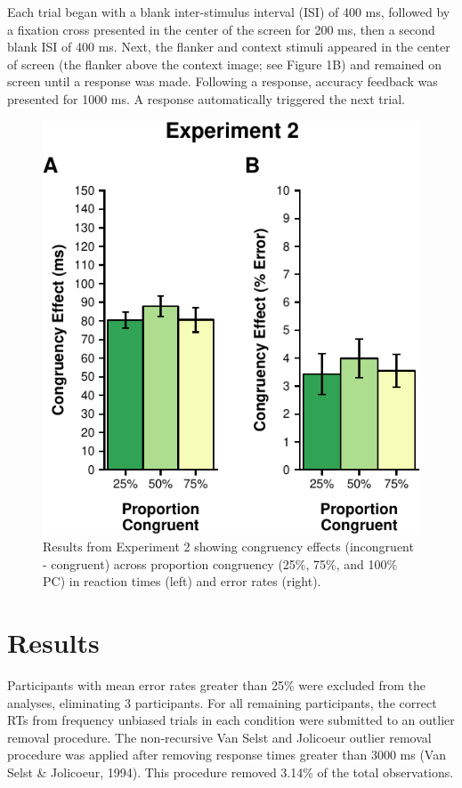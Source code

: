 \documentclass[english,,man,floatsintext]{apa6}
\begin{document}
Each trial began with a blank inter-stimulus interval (ISI) of 400 ms, followed by a fixation cross presented in the center of the screen for 200 ms, then a second blank ISI of 400 ms. Next, the flanker and context stimuli appeared in the center of screen (the flanker above the context image; see Figure 1B) and remained on screen until a response was made. Following a response, accuracy feedback was presented for 1000 ms. A response automatically triggered the next trial.

\begin{figure}
\centering
\includegraphics{manuscript_pretty_files/figure-latex/figure3-1.pdf}
\caption{\label{fig:figure3}Results from Experiment 2 showing congruency effects (incongruent - congruent) across proportion congruency (25\%, 75\%, and 100\% PC) in reaction times (left) and error rates (right).}
\end{figure}



\hypertarget{results-1}{%
\section{Results}\label{results-1}}

Participants with mean error rates greater than 25\% were excluded from the analyses, eliminating 3 participants. For all remaining participants, the correct RTs from frequency unbiased trials in each condition were submitted to an outlier removal procedure. The non-recursive Van Selst and Jolicoeur outlier removal procedure was applied after removing response times greater than 3000 ms (Van Selst \& Jolicoeur, 1994). This procedure removed 3.14\% of the total observations.
\end{document}
